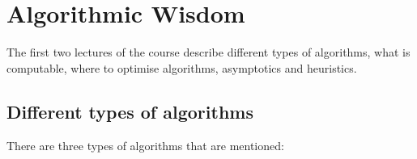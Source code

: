 
\section{Algorithmic Wisdom}

The first two lectures of the course describe different types of algorithms,
what is computable, where to optimise algorithms, asymptotics and heuristics.

\subsection{Different types of algorithms}

There are three types of algorithms that are mentioned:


